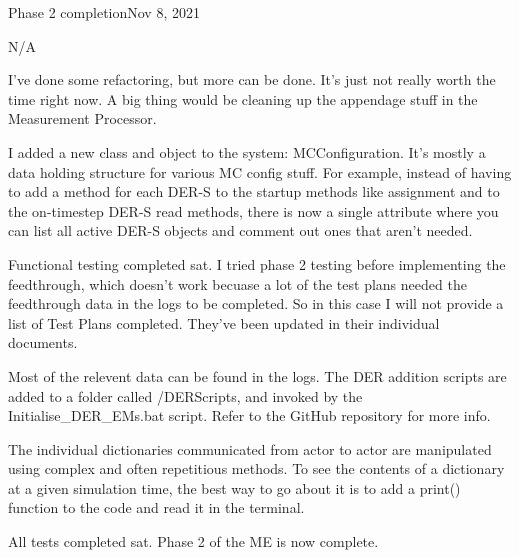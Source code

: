 \begin{entry}{Phase 2 completion}{Nov 8, 2021}
    \parameters
    
    N/A

    \observations

    I've done some refactoring, but more can be done. It's just not really worth the time right now. A big thing would
    be cleaning up the appendage stuff in the Measurement Processor.

    I added a new class and object to the system: MCConfiguration. It's mostly a data holding structure for various MC
    config stuff. For example, instead of having to add a method for each DER-S to the startup methods like assignment
    and to the on-timestep DER-S read methods, there is now a single attribute where you can list all active DER-S
    objects and comment out ones that aren't needed.

    Functional testing completed sat. I tried phase 2 testing before implementing the feedthrough, which doesn't work
    becuase a lot of the test plans needed the feedthrough data in the logs to be completed. So in this case I will
    not provide a list of Test Plans completed. They've been updated in their individual documents.


    \data

    Most of the relevent data can be found in the logs. The DER addition scripts are added to a folder called
    /DERScripts, and invoked by the Initialise_DER_EMs.bat script. Refer to the GitHub repository for more info.

    The individual dictionaries communicated from actor to actor are manipulated using complex and often repetitious
    methods. To see the contents of a dictionary at a given simulation time, the best way to go about it is to add
    a print() function to the code and read it in the terminal.

    \results
    
    All tests completed sat. Phase 2 of the ME is now complete.


\end{entry}


